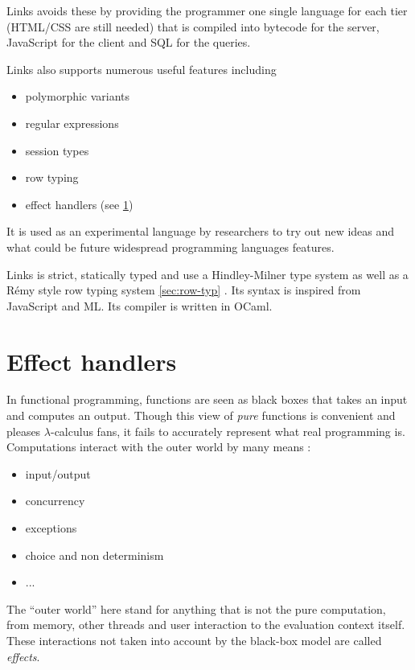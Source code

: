 \documentclass[nonacm=true, language=french, language=english]{acmart}
\begin{document}
Links avoids these by providing the programmer one single language for each tier (HTML/CSS are still needed) that is compiled into bytecode for the server, JavaScript for the client and SQL for the queries.

Links also supports numerous useful features including
\begin{itemize}
  \item polymorphic variants
  \item regular expressions
  \item session types
  \item row typing
  \item effect handlers (see \ref{sec:handlers})
\end{itemize}
It is used as an experimental language by researchers to try out new ideas and what could be future widespread programming languages features.

Links is strict, statically typed and use a Hindley-Milner type system as well as a Rémy style row typing system \ref{sec:row-typ} \cite{}. Its syntax is inspired from JavaScript and ML. Its compiler \cite{} is written in OCaml.


\section{Effect handlers}
\label{sec:handlers}

In functional programming, functions are seen as black boxes that takes an input and computes an output. Though this view of \emph{pure} functions is convenient and pleases $\lambda$-calculus fans, it fails to accurately represent what real programming is. Computations interact with the outer world by many means :
\begin{itemize}
  \item input/output
  \item concurrency
  \item exceptions
  \item choice and non determinism
  \item ...
\end{itemize}
The ``outer world'' here stand for anything that is not the pure computation, from memory, other threads and user interaction to the evaluation context itself.
These interactions not taken into account by the black-box model are called \emph{effects}.
\end{document}

